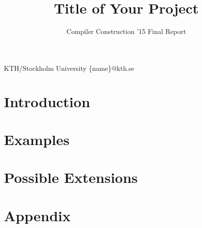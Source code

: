 \documentclass[nocopyrightspace,11pt,authoryear,preprint]{sigplanconf}
\begin{document}


\title{Title of Your Project}
\subtitle{Compiler Construction '15 Final Report}

           {KTH/Stockholm University}
           {\{name\}@kth.se}

\maketitle

\section{Introduction}


\section{Examples}


\section{Possible Extensions}


\onecolumn
\section{Appendix}

\end{document}
